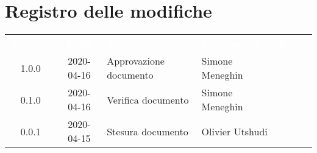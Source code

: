 \section*{Registro delle modifiche}
{
	\centering
	\begin{longtable}{ c c C{4cm}  C{4cm}  C{3cm} }
		\textcolor{white}{\textbf{Versione}} & \textcolor{white}{\textbf{Data}} & \textcolor{white}{\textbf{Descrizione}} & \textcolor{white}{\textbf{Nominativo}} & \textcolor{white}{\textbf{Ruolo}}\\		
		1.0.0 & 2020-04-16 & Approvazione documento & Simone Meneghin &\RdP{}\\		
		0.1.0 & 2020-04-16 & Verifica documento & Simone Meneghin &\ver{}\\		
		0.0.1 & 2020-04-15 & Stesura documento & Olivier Utshudi &\reda{}\\		
		
	\end{longtable}

}